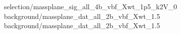 {selection/massplane_sig_all_4b_vbf_Xwt_1p5_k2V_0}
{background/massplane_dat_all_2b_vbf_Xwt_1.5}
{background/massplane_dat_all_2b_vbf_Xwt_1.5}
